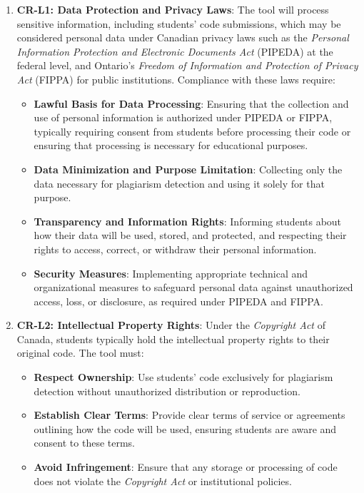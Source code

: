 \documentclass[12pt]{article}
\begin{document}
\begin{enumerate}
    \item \textbf{CR-L1: Data Protection and Privacy Laws}: The tool will process sensitive
    information, including students' code submissions, which may be considered personal
    data under Canadian privacy laws such as the \textit{Personal Information Protection 
    and Electronic Documents Act} (PIPEDA) at the federal level, and Ontario's \textit{Freedom of 
    Information and Protection of Privacy Act} (FIPPA) for public institutions. Compliance with these 
    laws require:
    \begin{itemize}
        \item \textbf{Lawful Basis for Data Processing}: Ensuring that the collection and use of 
        personal information is authorized under PIPEDA or FIPPA, typically requiring consent from 
        students before processing their code or ensuring that processing is necessary for educational purposes.
        \item \textbf{Data Minimization and Purpose Limitation}: Collecting only the data
        necessary for plagiarism detection and using it solely for that purpose.
        \item \textbf{Transparency and Information Rights}: Informing students about how
        their data will be used, stored, and protected, and respecting their rights to
        access, correct, or withdraw their personal information.
        \item \textbf{Security Measures}: Implementing appropriate technical and
        organizational measures to safeguard personal data against unauthorized access,
        loss, or disclosure, as required under PIPEDA and FIPPA.
    \end{itemize}

    \item \textbf{CR-L2: Intellectual Property Rights}: Under the \textit{Copyright Act} of Canada, 
    students typically hold the intellectual property rights to their original code. 
    The tool must:
    \begin{itemize}
        \item \textbf{Respect Ownership}: Use students' code exclusively for plagiarism
        detection without unauthorized distribution or reproduction.
        \item \textbf{Establish Clear Terms}: Provide clear terms of service or agreements
        outlining how the code will be used, ensuring students are aware and consent to
        these terms.
        \item \textbf{Avoid Infringement}: Ensure that any storage or processing of code
        does not violate the \textit{Copyright Act} or institutional policies.
    \end{itemize}


\end{enumerate}
\end{document}
